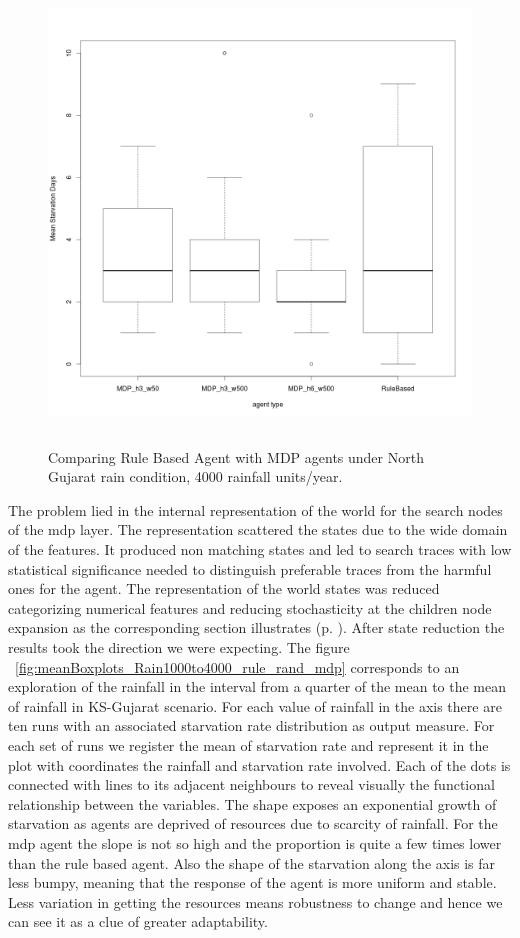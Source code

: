 \documentclass[11pt,oneside,a4paper,openright]{report}
\begin{document}
\begin{figure}[!htb]
\centering
\includegraphics[height=12.2cm]{figures/expm/noReduccClim4000}
\caption{Comparing Rule Based Agent with MDP agents under North Gujarat rain condition, 4000 rainfall 
units/year.}
\label{fig:noReduccClim4000}
\end{figure}


The problem lied in the internal representation of the world for the search nodes of the mdp layer. The 
representation scattered the states due to the wide domain of the features. It produced non matching states
and led to search traces with low statistical significance needed to distinguish preferable traces
from the harmful ones for the agent. The representation of the world states was reduced categorizing numerical
features and reducing stochasticity at the children node expansion as the corresponding section illustrates
(p. \pageref{sec:ReduccStates}).
After state reduction the results took the direction we were expecting. The figure 
~\ref{fig:meanBoxplots_Rain1000to4000_rule_rand_mdp} corresponds to an exploration of the rainfall in the 
interval from a quarter of the mean to the mean of rainfall in KS-Gujarat scenario. For each value of rainfall
in the axis there are ten runs with an associated starvation rate distribution as output measure. For
each set of runs we register the mean of starvation rate and represent it in the plot with coordinates the 
rainfall and starvation rate involved. Each of the dots is connected with lines to its adjacent neighbours 
to reveal visually the functional relationship between the variables. 
The shape exposes an exponential growth of starvation as agents are deprived of resources due to scarcity of 
rainfall. For the mdp agent the slope is not so high and the proportion is quite a few times lower than the 
rule based agent. Also the shape of the starvation along the axis is far less bumpy, meaning that the response 
of the agent is more uniform and stable. Less variation in getting the resources means robustness to change
and hence we can see it as a clue of greater adaptability.
\end{document}
